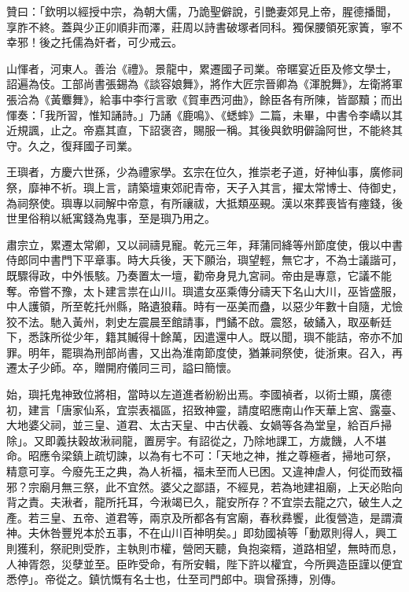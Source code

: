 \begin{pinyinscope}
 贊曰：「欽明以經授中宗，為朝大儒，乃詭聖僻說，引艷妻郊見上帝，腥德播聞，享胙不終。蓋與少正卯順非而澤，莊周以詩書破塚者同科。獨保腰領死家簀，寧不幸邪！後之托儒為奸者，可少戒云。



 山惲者，河東人。善治《禮》。景龍中，累遷國子司業。帝暱宴近臣及修文學士，詔遍為伎。工部尚書張錫為《談容娘舞》，將作大匠宗晉卿為《渾脫舞》，左衛將軍張洽為《黃麞舞》，給事中李行言歌《賀車西河曲》，餘臣各有所陳，皆鄙黷；而出惲奏：「我所習，惟知誦詩。」乃誦《鹿鳴》、《蟋蟀》二篇，未畢，中書令李嶠以其近規諷，止之。帝嘉其直，下詔褒咨，賜服一稱。其後與欽明僻論阿世，不能終其守。久之，復拜國子司業。



 王璵者，方慶六世孫，少為禮家學。玄宗在位久，推崇老子道，好神仙事，廣修祠祭，靡神不祈。璵上言，請築壇東郊祀青帝，天子入其言，擢太常博士、侍御史，為祠祭使。璵專以祠解中帝意，有所禳祓，大抵類巫覡。漢以來葬喪皆有瘞錢，後世里俗稍以紙寓錢為鬼事，至是璵乃用之。



 肅宗立，累遷太常卿，又以祠禱見寵。乾元三年，拜蒲同絳等州節度使，俄以中書侍郎同中書門下平章事。時大兵後，天下願治，璵望輕，無它才，不為士議諧可，既驟得政，中外悵駭。乃奏置太一壇，勸帝身見九宮祠。帝由是專意，它議不能奪。帝嘗不豫，太卜建言祟在山川。璵遣女巫乘傳分禱天下名山大川，巫皆盛服，中人護領，所至乾托州縣，賂遺狼藉。時有一巫美而蠱，以惡少年數十自隨，尤憸狡不法。馳入黃州，刺史左震晨至館請事，門鐍不啟。震怒，破鐍入，取巫斬廷下，悉誅所從少年，籍其贓得十餘萬，因遣還中人。既以聞，璵不能詰，帝亦不加罪。明年，罷璵為刑部尚書，又出為淮南節度使，猶兼祠祭使，徙浙東。召入，再遷太子少師。卒，贈開府儀同三司，謚曰簡懷。



 始，璵托鬼神致位將相，當時以左道進者紛紛出焉。李國禎者，以術士顯，廣德初，建言「唐家仙系，宜崇表福區，招致神靈，請度昭應南山作天華上宮、露臺、大地婆父祠，並三皇、道君、太古天皇、中古伏羲、女媧等各為堂皇，給百戶掃除」。又即義扶穀故湫祠龍，置房宇。有詔從之，乃除地課工，方歲饑，人不堪命。昭應令梁鎮上疏切諫，以為有七不可：「天地之神，推之尊極者，掃地可祭，精意可享。今廢先王之典，為人祈福，福未至而人已困。又違神虐人，何從而致福邪？宗廟月無三祭，此不宜然。婆父之鄙語，不經見，若為地建祖廟，上天必貽向背之責。夫湫者，龍所托耳，今湫竭已久，龍安所存？不宜崇去龍之穴，破生人之產。若三皇、五帝、道君等，兩京及所都各有宮廟，春秋彞饗，此復營造，是謂瀆神。夫休咎豐兇本於五事，不在山川百神明矣。」即劾國禎等「動眾則得人，興工則獲利，祭祀則受胙，主執則市權，營罔天聽，負抱粢糈，道路相望，無時而息，人神胥怨，災孽並至。臣昨受命，有所安輯，陛下許以權宜，今所興造臣謹以便宜悉停」。帝從之。鎮忼慨有名士也，仕至司門郎中。璵曾孫摶，別傳。



\end{pinyinscope}